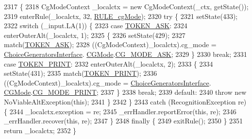 \begin{DoxyCode}
2317                                                                   \{
2318     CgModeContext \_localctx = \textcolor{keyword}{new} CgModeContext(\_ctx, getState());
2319     enterRule(\_localctx, 32, \hyperlink{classgov_1_1nasa_1_1jpf_1_1inspector_1_1client_1_1parser_1_1_console_grammar_parser_aff9cdfa31bbb232d21adea605f1a0615}{RULE\_cgMode});
2320     \textcolor{keywordflow}{try} \{
2321       setState(433);
2322       \textcolor{keywordflow}{switch} (\_input.LA(1)) \{
2323       \textcolor{keywordflow}{case} \hyperlink{classgov_1_1nasa_1_1jpf_1_1inspector_1_1client_1_1parser_1_1_console_grammar_parser_aceaa83591a76f17801362890ec5ace12}{TOKEN\_ASK}:
2324         enterOuterAlt(\_localctx, 1);
2325         \{
2326         setState(429);
2327         match(\hyperlink{classgov_1_1nasa_1_1jpf_1_1inspector_1_1client_1_1parser_1_1_console_grammar_parser_aceaa83591a76f17801362890ec5ace12}{TOKEN\_ASK});
2328          ((CgModeContext)\_localctx).cg\_mode =   \hyperlink{interfacegov_1_1nasa_1_1jpf_1_1inspector_1_1interfaces_1_1_choice_generators_interface}{ChoiceGeneratorsInterface}.
      \hyperlink{enumgov_1_1nasa_1_1jpf_1_1inspector_1_1interfaces_1_1_choice_generators_interface_1_1_c_g_mode}{CGMode}.\hyperlink{enumgov_1_1nasa_1_1jpf_1_1inspector_1_1interfaces_1_1_choice_generators_interface_1_1_c_g_mode_aa81956eaa60ff2722dbaa12f1a1b89bd}{CG\_MODE\_ASK}; 
2329         \}
2330         \textcolor{keywordflow}{break};
2331       \textcolor{keywordflow}{case} \hyperlink{classgov_1_1nasa_1_1jpf_1_1inspector_1_1client_1_1parser_1_1_console_grammar_parser_a26f7fc768e8725fbe68d0edaa63d6647}{TOKEN\_PRINT}:
2332         enterOuterAlt(\_localctx, 2);
2333         \{
2334         setState(431);
2335         match(\hyperlink{classgov_1_1nasa_1_1jpf_1_1inspector_1_1client_1_1parser_1_1_console_grammar_parser_a26f7fc768e8725fbe68d0edaa63d6647}{TOKEN\_PRINT});
2336          ((CgModeContext)\_localctx).cg\_mode =   \hyperlink{interfacegov_1_1nasa_1_1jpf_1_1inspector_1_1interfaces_1_1_choice_generators_interface}{ChoiceGeneratorsInterface}.
      \hyperlink{enumgov_1_1nasa_1_1jpf_1_1inspector_1_1interfaces_1_1_choice_generators_interface_1_1_c_g_mode}{CGMode}.\hyperlink{enumgov_1_1nasa_1_1jpf_1_1inspector_1_1interfaces_1_1_choice_generators_interface_1_1_c_g_mode_aa57768ae6f1c100e6b2acbf7abe3aa7d}{CG\_MODE\_PRINT}; 
2337         \}
2338         \textcolor{keywordflow}{break};
2339       \textcolor{keywordflow}{default}:
2340         \textcolor{keywordflow}{throw} \textcolor{keyword}{new} NoViableAltException(\textcolor{keyword}{this});
2341       \}
2342     \}
2343     \textcolor{keywordflow}{catch} (RecognitionException re) \{
2344       \_localctx.exception = re;
2345       \_errHandler.reportError(\textcolor{keyword}{this}, re);
2346       \_errHandler.recover(\textcolor{keyword}{this}, re);
2347     \}
2348     \textcolor{keywordflow}{finally} \{
2349       exitRule();
2350     \}
2351     \textcolor{keywordflow}{return} \_localctx;
2352   \}
\end{DoxyCode}
